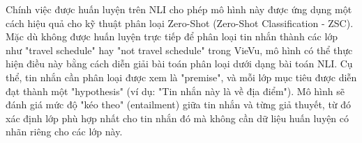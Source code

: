  Chính việc được huấn luyện trên NLI cho phép mô hình này được ứng dụng một cách hiệu quả cho kỹ thuật phân loại Zero-Shot (Zero-Shot Classification - ZSC). Mặc dù không được huấn luyện trực tiếp để phân loại tin nhắn thành các lớp như "travel schedule" hay "not travel schedule" trong VieVu, mô hình có thể thực hiện điều này bằng cách diễn giải bài toán phân loại dưới dạng bài toán NLI. Cụ thể, tin nhắn cần phân loại được xem là "premise", và mỗi lớp mục tiêu được diễn đạt thành một "hypothesis" (ví dụ: "Tin nhắn này là về địa điểm"). Mô hình sẽ đánh giá mức độ "kéo theo" (entailment) giữa tin nhắn và từng giả thuyết, từ đó xác định lớp phù hợp nhất cho tin nhắn đó mà không cần dữ liệu huấn luyện có nhãn riêng cho các lớp này.





